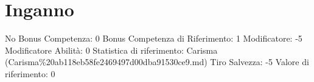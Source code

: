 \section{Inganno}\label{inganno}

\begin{description}
\tightlist
\item[Tags: ABI]
No Bonus Competenza: 0 Bonus Competenza di Riferimento: 1 Modificatore:
-5 Modificatore Abilità: 0 Statistica di riferimento: Carisma
(Carisma\%20ab118eb58fe2469497d00dba91530ce9.md) Tiro Salvezza: -5
Valore di riferimento: 0
\end{description}
